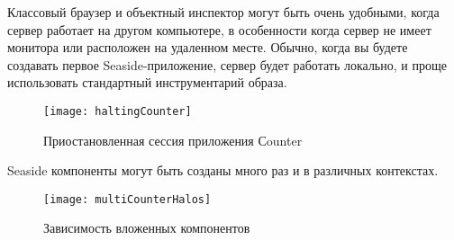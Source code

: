 \documentclass[a4paper,10pt,twoside]{book}
\begin{document}

Классовый браузер и объектный инспектор могут быть очень удобными,
когда сервер работает на другом компьютере,
в особенности когда сервер не имеет монитора или расположен
на удаленном месте.
Обычно, когда вы будете создавать первое Seaside-приложение,
сервер будет работать локально,
и проще использовать стандартный инструментарий образа.

\begin{figure}[ht]
\begin{center}
\texttt{[image: haltingCounter]}
\caption{Приостановленная сессия приложения Сounter}
\end{center}
\end{figure}




Seaside компоненты могут быть созданы много раз и в различных контекстах.

\begin{figure}[ht]
\begin{center}
\texttt{[image: multiCounterHalos]}
\caption{Зависимость вложенных компонентов}
\end{center}
\end{figure}
\end{document}
